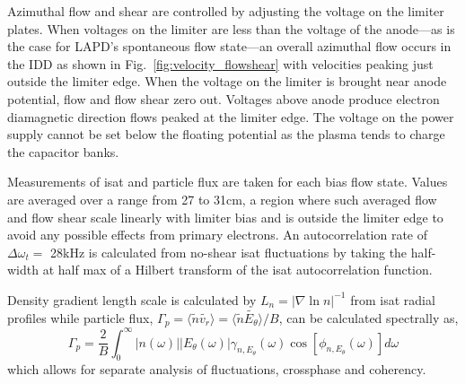 \documentclass[%
 aps,
 prl,
 amsmath,amssymb,
 reprint,%
]{revtex4-1}
\begin{document}
Azimuthal flow and shear are controlled by adjusting the voltage on the limiter plates. When voltages on the limiter are less than the voltage of the anode---as is the case for LAPD's spontaneous flow state---an overall azimuthal flow occurs in the IDD as shown in Fig.~\ref{fig:velocity_flowshear} with velocities peaking just outside the limiter edge. When the voltage on the limiter is brought near anode potential, flow and flow shear zero out. Voltages above anode produce electron diamagnetic direction flows peaked at the limiter edge. The voltage on the power supply cannot be set below the floating potential as the plasma tends to charge the capacitor banks.

Measurements of isat and particle flux are taken for each bias flow state. Values are averaged over a range from 27 to 31cm, a region where such averaged flow and flow shear scale linearly with limiter bias and is outside the limiter edge to avoid any possible effects from primary electrons. An autocorrelation rate of $\Delta \omega_{t} = $ 28kHz is calculated from no-shear isat fluctuations by taking the half-width at half max of a Hilbert transform of the isat autocorrelation function.

Density gradient length scale is calculated by $L_{n} = \lvert \nabla \ln n \rvert ^{-1}$ from isat radial profiles while particle flux, $\Gamma_{p} = \langle \tilde{n} \tilde{v_{r}} \rangle = \langle \tilde{n} \tilde{E_{\theta}} \rangle /B$, can be calculated spectrally as\cite{powers74}, 
\begin{equation}
\Gamma_{p} = \frac{2}{B} \int^{\infty}_{0} \lvert n(\omega) \rvert \lvert E_{\theta}(\omega) \rvert \gamma_{n,E_{\theta}}(\omega) \cos [\phi_{n,E_{\theta}}(\omega)] d\omega
\label{eq:fluxint}
\end{equation}
which allows for separate analysis of fluctuations, crossphase and coherency.
\end{document}
